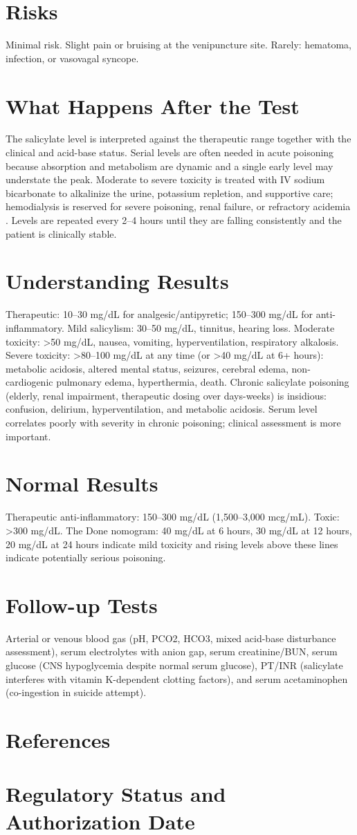 \section*{Risks}
Minimal risk. Slight pain or bruising at the venipuncture site. Rarely: hematoma, infection, or vasovagal syncope.
\section*{What Happens After the Test}
The salicylate level is interpreted against the therapeutic range together with the clinical and acid-base status. Serial levels are often needed in acute poisoning because absorption and metabolism are dynamic and a single early level may understate the peak. Moderate to severe toxicity is treated with IV sodium bicarbonate to alkalinize the urine, potassium repletion, and supportive care; hemodialysis is reserved for severe poisoning, renal failure, or refractory acidemia \cite{omalley2007emergency,proudfoot2004position}. Levels are repeated every 2--4 hours until they are falling consistently and the patient is clinically stable.
\section*{Understanding Results}
Therapeutic: 10--30 mg/dL for analgesic/antipyretic; 150--300 mg/dL for anti-inflammatory. Mild salicylism: 30--50 mg/dL, tinnitus, hearing loss. Moderate toxicity: >50 mg/dL, nausea, vomiting, hyperventilation, respiratory alkalosis. Severe toxicity: >80--100 mg/dL at any time (or >40 mg/dL at 6+ hours): metabolic acidosis, altered mental status, seizures, cerebral edema, non-cardiogenic pulmonary edema, hyperthermia, death. Chronic salicylate poisoning (elderly, renal impairment, therapeutic dosing over days-weeks) is insidious: confusion, delirium, hyperventilation, and metabolic acidosis. Serum level correlates poorly with severity in chronic poisoning; clinical assessment is more important.
\section*{Normal Results}
Therapeutic anti-inflammatory: 150--300 mg/dL (1,500--3,000 mcg/mL). Toxic: >300 mg/dL. The Done nomogram: 40 mg/dL at 6 hours, 30 mg/dL at 12 hours, 20 mg/dL at 24 hours indicate mild toxicity and rising levels above these lines indicate potentially serious poisoning.
\section*{Follow-up Tests}
Arterial or venous blood gas (pH, PCO2, HCO3, mixed acid-base disturbance assessment), serum electrolytes with anion gap, serum creatinine/BUN, serum glucose (CNS hypoglycemia despite normal serum glucose), PT/INR (salicylate interferes with vitamin K-dependent clotting factors), and serum acetaminophen (co-ingestion in suicide attempt).
\section*{References}



\clearpage
\section*{Regulatory Status and Authorization Date}

\clearpage
